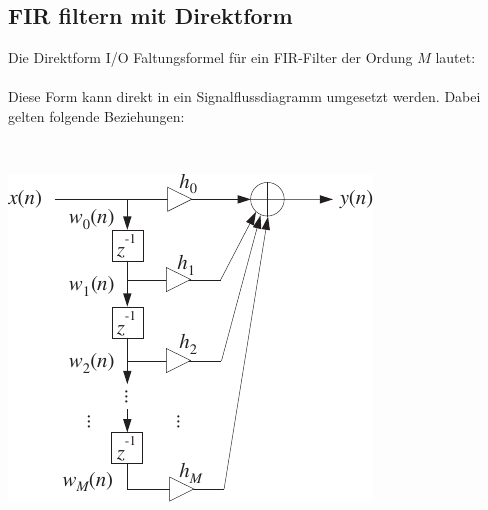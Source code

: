 	\subsection{FIR filtern mit Direktform}
		\begin{minipage}{0.5\textwidth}
			Die Direktform I/O Faltungsformel für ein FIR-Filter der Ordung $M$ lautet:\\[0.2cm]
			\\[0.4cm]
			Diese Form kann direkt in ein Signalflussdiagramm umgesetzt werden. Dabei gelten folgende Beziehungen:\\[0.2cm]
		\end{minipage}\begin{minipage}{0.03\textwidth}$ $\end{minipage}
		\begin{minipage}{0.4\textwidth}
			\includegraphics[width = \textwidth]{pic/firFlussdiagramm.pdf}
		\end{minipage}\\[0.2cm]

